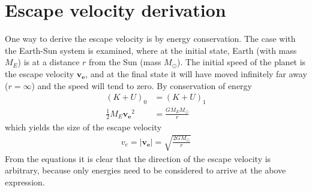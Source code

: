 \documentclass[aps,reprint]{revtex4-1}
\newcommand\blankpage{%
  \null
  \thispagestyle{empty}%
  \addtocounter{page}{-1}%
  \newpage}
\begin{document}
\section{Escape velocity derivation}
\label{sec:escapevelocityderivation}
One way to derive the escape velocity is by energy conservation. The case with the Earth-Sun system
is examined, where at the initial state, Earth (with mass $M_E$) is at a
distance $r$ from the Sun (mass $M_\odot$). The
initial speed of the planet is the escape velocity $\mathbf{v_e}$, and at the
final state it will have moved infinitely far away ($r = \infty$) and the speed
will tend to zero. By conservation of energy
\begin{align*}
  (K + U)_0 &= (K + U)_1 \\
  \frac{1}{2} M_E \mathbf{v_e}^2 &= \frac{GM_E M_\odot}{r}
\end{align*}
which yields the size of the escape velocity
\begin{align}
  v_e = |\mathbf{v_e}| = \sqrt{\frac{2GM_\odot}{r}}
\end{align}
From the equations it is clear that the direction of the escape velocity is
arbitrary, because only energies need to be considered to arrive at the above
expression.
\blankpage
\end{document}

